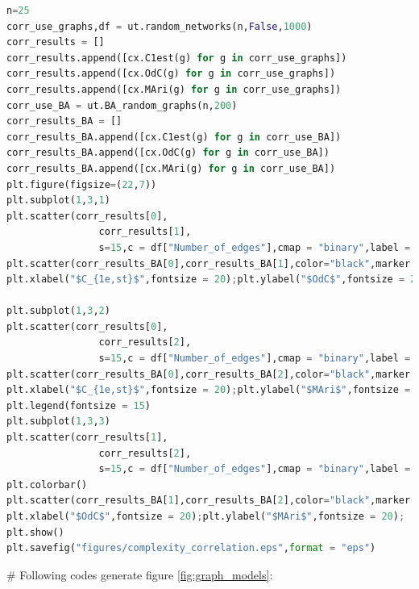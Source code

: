 \documentclass[12pt]{article}
\begin{document}
\begin{lstlisting}[breaklines=true,language=Python]
n=25
corr_use_graphs,df = ut.random_networks(n,False,1000)
corr_results = []
corr_results.append([cx.C1est(g) for g in corr_use_graphs])
corr_results.append([cx.OdC(g) for g in corr_use_graphs])
corr_results.append([cx.MAri(g) for g in corr_use_graphs])
corr_use_BA = ut.BA_random_graphs(n,200)
corr_results_BA = []
corr_results_BA.append([cx.C1est(g) for g in corr_use_BA])
corr_results_BA.append([cx.OdC(g) for g in corr_use_BA])
corr_results_BA.append([cx.MAri(g) for g in corr_use_BA])
plt.figure(figsize=(22,7))
plt.subplot(1,3,1)
plt.scatter(corr_results[0],
                corr_results[1],
                s=15,c = df["Number_of_edges"],cmap = "binary",label = "$G(n,m)$ random graphs")
plt.scatter(corr_results_BA[0],corr_results_BA[1],color="black",marker = "x",label = "BA Graphs")
plt.xlabel("$C_{1e,st}$",fontsize = 20);plt.ylabel("$OdC$",fontsize = 20);

plt.subplot(1,3,2)
plt.scatter(corr_results[0],
                corr_results[2],
                s=15,c = df["Number_of_edges"],cmap = "binary",label = "$G(n,m)$ random graphs")
plt.scatter(corr_results_BA[0],corr_results_BA[2],color="black",marker = "x",label = "BA Graphs")
plt.xlabel("$C_{1e,st}$",fontsize = 20);plt.ylabel("$MAri$",fontsize = 20);
plt.legend(fontsize = 15)
plt.subplot(1,3,3)
plt.scatter(corr_results[1],
                corr_results[2],
                s=15,c = df["Number_of_edges"],cmap = "binary",label = "$G(n,m)$ random graphs")
plt.colorbar()
plt.scatter(corr_results_BA[1],corr_results_BA[2],color="black",marker = "x",label = "BA Graphs")
plt.xlabel("$OdC$",fontsize = 20);plt.ylabel("$MAri$",fontsize = 20);
plt.show()
plt.savefig("figures/complexity_correlation.eps",format = "eps")
\end{lstlisting}
\noindent
\newline
\# Following codes generate figure \ref{fig:graph_models}:
\end{document}
